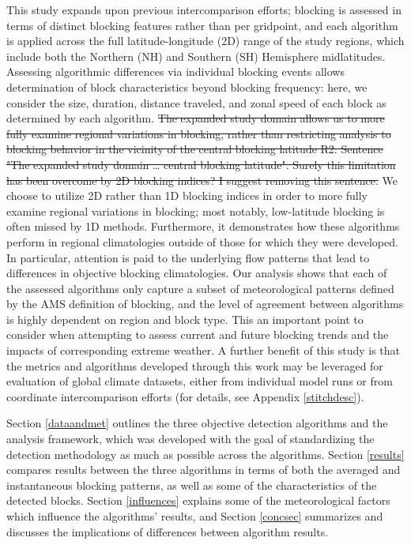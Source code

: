 \documentclass[smallextended]{svjour3}       %
\numberwithin{equation}{section}
\begin{document}
This study expands upon previous intercomparison efforts; blocking is assessed in terms of distinct blocking features rather than per gridpoint, and each algorithm is applied across the full latitude-longitude (2D) range of the study regions, which include both the Northern (NH) and Southern (SH) Hemisphere midlatitudes. Assessing algorithmic differences via individual blocking events allows determination of block characteristics beyond blocking frequency: here, we consider the size, duration, distance traveled, and zonal speed of each block as determined by each algorithm. {\color{teal}\sout{The expanded study domain allows us to more fully examine regional variations in blocking, rather than restricting analysis to blocking behavior in the vicinity of the central blocking latitude R2: Sentence "The expanded study domain … central blocking latitude". Surely this limitation has been overcome by 2D blocking indices? I suggest removing this sentence.}} {\color{blue}We choose to utilize 2D rather than 1D blocking indices in order to more fully examine regional variations in blocking}; most notably, low-latitude blocking is often missed by 1D methods. Furthermore, it demonstrates how these algorithms perform in regional climatologies outside of those for which they were developed. In particular, attention is paid to the underlying flow patterns that lead to differences in objective blocking climatologies. Our analysis shows that each of the assessed algorithms only capture a subset of meteorological patterns defined by the AMS definition of blocking, and the level of agreement between algorithms is highly dependent on region and block type.  This an important point to consider when attempting to assess current and future blocking trends and the impacts of corresponding extreme weather.  A further benefit of this study is that the metrics and algorithms developed through this work may be leveraged for evaluation of global climate datasets, either from individual model runs or from coordinate intercomparison efforts (for details, see Appendix \ref{stitchdesc}).


Section \ref{dataandmet} outlines the three objective detection algorithms and the analysis framework, which was developed with the goal of standardizing the detection methodology as much as possible across the algorithms. Section \ref{results} compares results between the three algorithms in terms of both the averaged and instantaneous blocking patterns, as well as some of the characteristics of the detected blocks. Section \ref{influences} explains some of the meteorological factors which influence the algorithms' results, and Section \ref{concsec} summarizes and discusses the implications of differences between algorithm results. 
\end{document}
